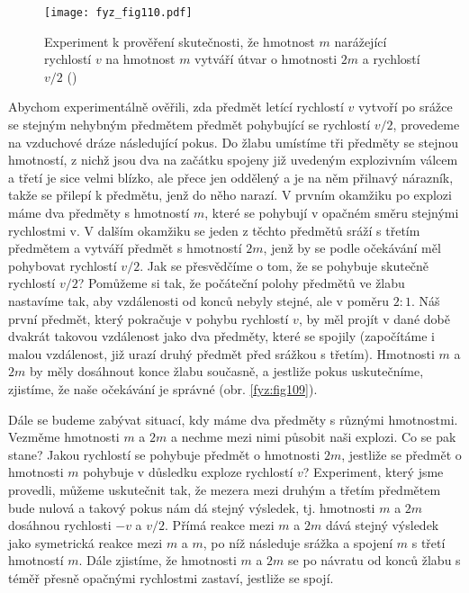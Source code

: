 {{    \begin{figure}[ht!]  %
      \centering
      \texttt{[image: fyz\_fig110.pdf]}
      \caption{Experiment k prověření skutečnosti, že hmotnost \(m\) narážející rychlostí \(v\) na hmotnost 
               \(m\) vytváří útvar o hmotnosti \(2m\) a rychlostí \(v/2\)
              (\cite[s.~146]{Feynman01})}
      \label{fyz:fig110}
    \end{figure}
    Abychom experimentálně ověřili, zda předmět letící rychlostí \(v\) vytvoří po srážce se stejným 
    nehybným předmětem předmět pohybující se rychlostí \(v/2\), provedeme na vzduchové dráze 
    následující pokus. Do žlabu umístíme tři předměty se stejnou hmotností, z nichž jsou dva na 
    začátku spojeny již uvedeným explozivním válcem a třetí je sice velmi blízko, ale přece jen 
    oddělený a je na něm přilnavý nárazník, takže se přilepí k předmětu, jenž do něho narazí. V 
    prvním okamžiku po explozi máme dva předměty s hmotností \(m\), které se pohybují v opačném 
    směru stejnými rychlostmi v. V dalším okamžiku se jeden z těchto předmětů sráží s třetím 
    předmětem a vytváří předmět s hmotností \(2m\), jenž by se podle očekávání měl pohybovat 
    rychlostí \(v/2\). Jak se přesvědčíme o tom, že se pohybuje skutečně rychlostí \(v/2\)? 
    Pomůžeme si tak, že počáteční polohy předmětů ve žlabu nastavíme tak, aby vzdálenosti od konců 
    nebyly stejné, ale v poměru \(2:1\). Náš první předmět, který pokračuje v pohybu rychlostí 
    \(v\), by měl projít v dané době dvakrát takovou vzdálenost jako dva předměty, které se spojily 
    (započítáme i malou vzdálenost, již urazí druhý předmět před srážkou s třetím). Hmotnosti \(m\) 
    a \(2m\) by měly dosáhnout konce žlabu současně, a jestliže pokus uskutečníme, zjistíme, že 
    naše očekávání je správné (obr. \ref{fyz:fig109}).

    Dále se budeme zabývat situací, kdy máme dva předměty s různými hmotnostmi. Vezměme hmotnosti 
    \(m\) a \(2m\) a nechme mezi nimi působit naši explozi. Co se pak stane? Jakou rychlostí se 
    pohybuje předmět o hmotnosti \(2m\), jestliže se předmět o hmotnosti \(m\) pohybuje v důsledku 
    exploze rychlostí \(v\)? Experiment, který jsme provedli, můžeme uskutečnit tak, že mezera mezi 
    druhým a třetím předmětem bude nulová a takový pokus nám dá stejný výsledek, tj. hmotnosti 
    \(m\) a \(2m\) dosáhnou rychlosti \(-v\) a \(v/2\). Přímá reakce mezi \(m\) a \(2m\) dává 
    stejný výsledek jako symetrická reakce mezi \(m\) a \(m\), po níž následuje srážka a spojení 
    \(m\) s třetí hmotností \(m\). Dále zjistíme, že hmotnosti \(m\) a \(2m\) se po návratu od 
    konců žlabu s téměř přesně opačnými rychlostmi zastaví, jestliže se spojí.

}}
